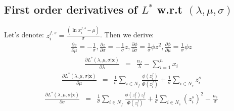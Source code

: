 \documentclass{article}
\begin{document}
\subsection{First order derivatives of $L^*$ w.r.t $\left(\lambda, \mu, \sigma \right)$}
\indent Let's denote: $z_i^{f,s} = \frac{\left(\ln x_i^{f,s} - \mu \right)}{\sigma}$. Then we derive: 
\begin{eqnarray}
\frac{\partial z}{\partial \mu} = - \frac{1}{\sigma} , \frac{\partial z} {\partial \sigma} = - \frac{1}{\sigma}z , \frac{\partial \phi}{\partial \sigma} = \frac{1}{\sigma}\phi z^2 , \frac{\partial \phi}{\partial \mu} = \frac{1}{\sigma}\phi z 
\end{eqnarray} 
\begin{eqnarray}
\frac{\partial L^*(\lambda, \mu, \sigma | \textbf{x}) }{\partial \lambda} &=& \frac{n_f}{\lambda} - \sum_{i = 1}^n x_i 
\end{eqnarray} 
\begin{eqnarray}
\frac{\partial L^*(\lambda, \mu, \sigma | \textbf{x}) }{\partial \mu} &=& \frac{1}{\sigma}\sum_{i \in N_f} \frac{\phi \left( z_i^f \right)}{\overline \Phi \left( z_i^f \right)} + \frac{1}{\sigma}\sum_{i \in N_s}z_i^s 
\end{eqnarray} 
\begin{eqnarray}
\frac{\partial L^*(\lambda, \mu, \sigma | \textbf{x}) }{\partial \sigma} &=& \frac{1}{\sigma} \sum_{i \in N_f} \frac{\phi \left( z_i^f \right) z_i^f }{\overline \Phi \left( z_i^f \right)} + \frac{1}{\sigma}\sum_{i \in N_s} (z_i^s)^2 - \frac{n_s}{\sigma} 
\end{eqnarray} 
\end{document}
